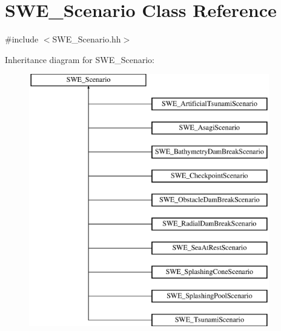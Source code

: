 \hypertarget{classSWE__Scenario}{\section{S\-W\-E\-\_\-\-Scenario Class Reference}
\label{classSWE__Scenario}
}


{\ttfamily \#include $<$S\-W\-E\-\_\-\-Scenario.\-hh$>$}

Inheritance diagram for S\-W\-E\-\_\-\-Scenario\-:\begin{figure}[H]
\begin{center}
\leavevmode
\includegraphics[height=11.000000cm]{classSWE__Scenario}
\end{center}
\end{figure}
